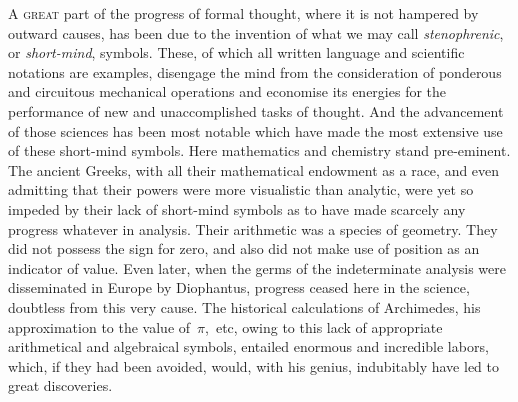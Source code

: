 \documentclass[12pt]{book}[2005/09/16]
\newcommand{\PageSep}[1]{\ignorespaces}
\newcommand{\First}[1]{\textsc{\large #1}}
\begin{document}
\First{A great} part of the progress of formal thought, where it is
not hampered by outward causes, has been due to the invention
of what we may call \emph{stenophrenic}, or \emph{short-mind}, symbols.
These, of which all written language and scientific notations are
examples, disengage the mind from the consideration of ponderous
and circuitous mechanical operations and economise its energies
for the performance of new and unaccomplished tasks of thought.
And the advancement of those sciences has been most notable
which have made the most extensive use of these short-mind symbols.
Here mathematics and chemistry stand pre-eminent. The
%
%
ancient Greeks, with all their mathematical endowment as a race,
and even admitting that their powers were more visualistic than
analytic, were yet so impeded by their lack of short-mind symbols
as to have made scarcely any progress whatever in analysis. Their
arithmetic was a species of geometry. They did not possess the
sign for zero, and also did not make use of position as an indicator
of value. Even later, when the germs of the indeterminate analysis
were disseminated in Europe by Diophantus, progress ceased
here in the science, doubtless from this very cause. The historical
%
calculations of Archimedes, his approximation to the value of~$\pi$,~etc,
owing to this lack of appropriate arithmetical and algebraical
symbols, entailed enormous and incredible labors, which, if
they had been avoided, would, with his genius, indubitably have
led to great discoveries.
\PageSep{viii}
\end{document}
